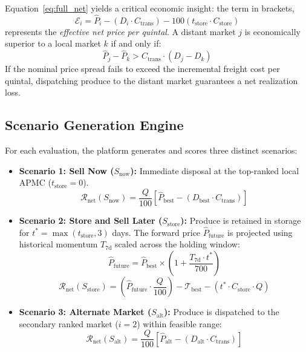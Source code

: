 \documentclass[conference]{IEEEtran}
\begin{document}
Equation~\eqref{eq:full_net} yields a critical economic insight: the term in brackets,
\begin{equation}
\mathcal{E}_i = \hat{P}_i - (D_i \cdot C_{\text{trans}}) - 100(t_{\text{store}} \cdot C_{\text{store}})
\end{equation}
represents the \textit{effective net price per quintal}. A distant market $j$ is economically superior to a local market $k$ if and only if:
\begin{equation}
\hat{P}_j - \hat{P}_k > C_{\text{trans}} \cdot (D_j - D_k)
\end{equation}
If the nominal price spread fails to exceed the incremental freight cost per quintal, dispatching produce to the distant market guarantees a net realization loss.

\subsection{Scenario Generation Engine}
For each evaluation, the platform generates and scores three distinct scenarios:
\begin{itemize}
    \item \textbf{Scenario 1: Sell Now ($S_{\text{now}}$):} Immediate disposal at the top-ranked local APMC ($t_{\text{store}}=0$). 
    \begin{equation}
    \mathcal{R}_{\text{net}}(S_{\text{now}}) = \frac{Q}{100} \left[ \hat{P}_{\text{best}} - (D_{\text{best}} \cdot C_{\text{trans}}) \right]
    \end{equation}
    \item \textbf{Scenario 2: Store and Sell Later ($S_{\text{store}}$):} Produce is retained in storage for $t^* = \max(t_{\text{store}}, 3)$ days. The forward price $\hat{P}_{\text{future}}$ is projected using historical momentum $T_{\text{7d}}$ scaled across the holding window:
    \begin{equation}
    \hat{P}_{\text{future}} = \hat{P}_{\text{best}} \times \left( 1 + \frac{T_{\text{7d}} \cdot t^*}{700} \right)
    \end{equation}
    \begin{equation}
    \mathcal{R}_{\text{net}}(S_{\text{store}}) = \left( \hat{P}_{\text{future}} \cdot \frac{Q}{100} \right) - \mathcal{T}_{\text{best}} - (t^* \cdot C_{\text{store}} \cdot Q)
    \end{equation}
    \item \textbf{Scenario 3: Alternate Market ($S_{\text{alt}}$):} Produce is dispatched to the secondary ranked market ($i=2$) within feasible range:
    \begin{equation}
    \mathcal{R}_{\text{net}}(S_{\text{alt}}) = \frac{Q}{100} \left[ \hat{P}_{\text{alt}} - (D_{\text{alt}} \cdot C_{\text{trans}}) \right]
    \end{equation}
\end{itemize}
\end{document}
